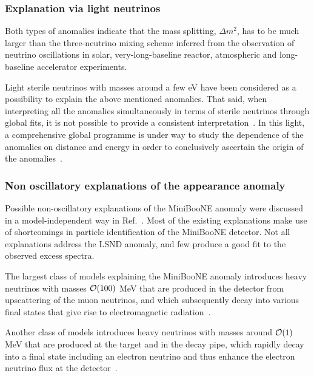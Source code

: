 \documentclass[10pt]{article}
\begin{document}
\subsubsection{Explanation via light neutrinos}
%
Both types of anomalies indicate that the mass splitting, $\Delta m^2$, has to be much larger than the three-neutrino mixing scheme inferred from the observation of neutrino oscillations in solar, very-long-baseline reactor, atmospheric and long-baseline accelerator experiments. 

Light sterile neutrinos with masses around a few eV have been considered as a possibility to explain the above mentioned anomalies. That said, when interpreting all the anomalies simultaneously in terms of sterile neutrinos through global fits, it is not possible to provide a consistent interpretation~\cite{Collin:2016rao,Gariazzo:2017fdh,Dentler:2017tkw,Dentler:2018sju}. In this light, a comprehensive global programme is under way to study the dependence of the anomalies on distance and energy in order to conclusively ascertain the origin of the anomalies~\cite{DellAcqua:2018lky}. 


\subsubsection{Non oscillatory explanations of the appearance anomaly}
%
Possible non-oscillatory explanations of the MiniBooNE anomaly were discussed in a model-independent way in Ref.~\cite{Brdar:2020tle}.
Most of the existing explanations make use of shortcomings in particle identification of the MiniBooNE detector. Not all explanations address the LSND anomaly, and few produce a good fit to the observed excess spectra. 

The largest class of models explaining the MiniBooNE anomaly introduces heavy neutrinos with masses ${\cal O}(100)$ MeV that are produced in the detector from upscattering of the muon neutrinos, and which subsequently decay into various final states that give rise to electromagnetic radiation~\cite{Gninenko:2009ks,Ballett:2018ynz,Bertuzzo:2018itn,Ballett:2019pyw,Abdullahi:2020nyr,Datta:2020auq,Dutta:2020scq,Abdallah:2020vgg,Abdallah:2020biq}.

Another class of models introduces heavy neutrinos with masses around ${\cal O}(1)$ MeV that are produced at the target and in the decay pipe, which rapidly decay into a final state including an electron neutrino and thus enhance the electron neutrino flux at the detector~\cite{Palomares-Ruiz:2005zbh,deGouvea:2019qre,Dentler:2019dhz,Bai:2015ztj}.
\end{document}
